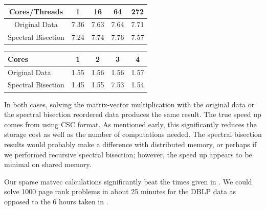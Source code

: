 \documentclass[11pt]{article}
\begin{document}
\begin{table}
	\centering
	\begin{tabular}[h]{|c||c|c|c|c|}
		\hline
		Cores/Threads& 1 & 16 & 64 & 272 \\
		\hline
		Original Data & 7.36 & 7.63 & 7.64 & 7.71\\
		Spectral Bisection & 7.24 & 7.74 & 7.76 & 7.57 \\
		\hline
	\end{tabular}
\label{tab:KNLTIME}
\end{table}

\begin{table}
	\centering
	\begin{tabular}[h]{|l||c|c|c|c|}
		\hline
		Cores & 1 & 2& 3 & 4 \\
		\hline
		Original Data & 1.55 & 1.56 & 1.56 & 1.57\\
		Spectral Bisection & 1.45 & 1.55 & 7.53 & 1.54 \\
		\hline
	\end{tabular}
\label{tab:ICESTIME}
\end{table}

In both cases, solving the matrix-vector multiplication with the original data
or the spectral bisection reordered data produces the same result. The true
speed up comes from using CSC format. As mentioned early, this significantly
reduces the storage cost as well as the number of computations needed. The
spectral bisection results would probably make a difference with distributed
memory, or perhaps if we performed recursive spectral bisection; however, the
speed up appears to be minimal on shared memory. 

Our sparse matvec calculations significantly beat the times given in \cite{xie}. We could solve 1000 page rank
problems in about 25 minutes for the DBLP data as opposed to the 6 hours taken
in \cite{xie}. 
\end{document}
